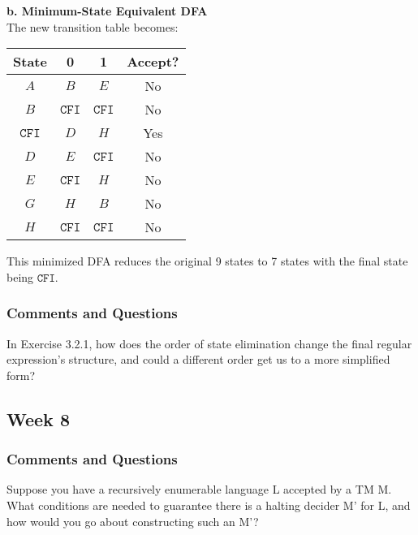 \documentclass{article}
\theoremstyle{theorem}
\theoremstyle{definition}
\theoremstyle{remark}
\begin{document}
\medskip

\textbf{b. Minimum-State Equivalent DFA}\\[1mm]
The new transition table becomes:
\begin{center}
\begin{tabular}{|c|c|c|c|}
\hline
State & 0   & 1   & Accept? \\ \hline
\(A\) & \(B\) & \(E\) & No \\ \hline
\(B\) & \(\texttt{CFI}\) & \(\texttt{CFI}\) & No \\ \hline
\(\texttt{CFI}\) & \(D\) & \(H\) & Yes \\ \hline
\(D\) & \(E\) & \(\texttt{CFI}\) & No \\ \hline
\(E\) & \(\texttt{CFI}\) & \(H\) & No \\ \hline
\(G\) & \(H\) & \(B\) & No \\ \hline
\(H\) & \(\texttt{CFI}\) & \(\texttt{CFI}\) & No \\ \hline
\end{tabular}
\end{center}
This minimized DFA reduces the original 9 states to 7 states with the final state being \(\texttt{CFI}\).

\subsubsection*{Comments and Questions}

In Exercise 3.2.1, how does the order of state elimination change the final regular expression’s structure, and could a different order get us to a more simplified form?

\subsection{Week 8}


\subsubsection*{Comments and Questions}

Suppose you have a recursively enumerable language L accepted by a TM M. What conditions are needed to guarantee there is a halting decider M' for L, and how would you go about constructing such an M'?
\end{document}
